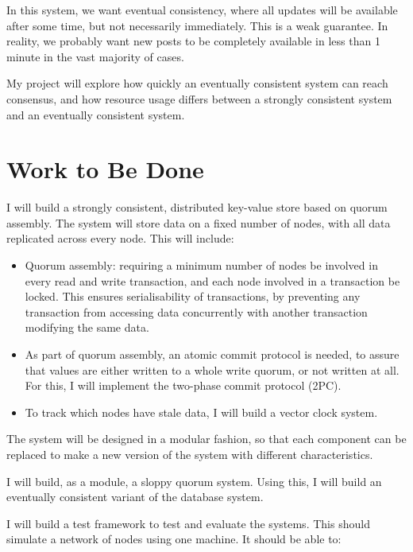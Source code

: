 In this system, we want eventual consistency, where all updates will be available after some time, but not necessarily immediately. This is a weak guarantee. In reality, we probably want new posts to be completely available in less than 1 minute in the vast majority of cases.

My project will explore how quickly an eventually consistent system can reach consensus, and how resource usage differs between a strongly consistent system and an eventually consistent system.

\section*{Work to Be Done}

I will build a strongly consistent, distributed key-value store based on quorum assembly. The system will store data on a fixed number of nodes, with all data replicated across every node. This will include:

\begin{itemize}
  \item
  Quorum assembly: requiring a minimum number of nodes be involved in every read and write transaction, and each node involved in a transaction be locked. This ensures serialisability of transactions, by preventing any transaction from accessing data concurrently with another transaction modifying the same data.

  \item
  As part of quorum assembly, an atomic commit protocol is needed, to assure that values are either written to a whole write quorum, or not written at all. For this, I will implement the two-phase commit protocol (2PC).

  \item
  To track which nodes have stale data, I will build a vector clock system.

\end{itemize}

The system will be designed in a modular fashion, so that each component can be replaced to make a new version of the system with different characteristics.

I will build, as a module, a sloppy quorum system. Using this, I will build an eventually consistent variant of the database system.

I will build a test framework to test and evaluate the systems. This should simulate a network of nodes using one machine. It should be able to:

